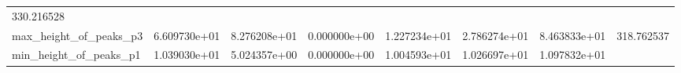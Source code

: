\documentclass[11pt]{article}
\begin{document}
\begin{longtable}[]{@{}llllllll@{}}
\begin{minipage}[t]{0.08\columnwidth}
330.216528\strut
\end{minipage}\tabularnewline
\begin{minipage}[t]{0.16\columnwidth}\raggedright
max\_height\_of\_peaks\_p3\strut
\end{minipage} & \begin{minipage}[t]{0.09\columnwidth}\raggedright
6.609730e+01\strut
\end{minipage} & \begin{minipage}[t]{0.09\columnwidth}\raggedright
8.276208e+01\strut
\end{minipage} & \begin{minipage}[t]{0.09\columnwidth}\raggedright
0.000000e+00\strut
\end{minipage} & \begin{minipage}[t]{0.09\columnwidth}\raggedright
1.227234e+01\strut
\end{minipage} & \begin{minipage}[t]{0.09\columnwidth}\raggedright
2.786274e+01\strut
\end{minipage} & \begin{minipage}[t]{0.09\columnwidth}\raggedright
8.463833e+01\strut
\end{minipage} & \begin{minipage}[t]{0.08\columnwidth}\raggedright
318.762537\strut
\end{minipage}\tabularnewline
\begin{minipage}[t]{0.16\columnwidth}\raggedright
min\_height\_of\_peaks\_p1\strut
\end{minipage} & \begin{minipage}[t]{0.09\columnwidth}\raggedright
1.039030e+01\strut
\end{minipage} & \begin{minipage}[t]{0.09\columnwidth}\raggedright
5.024357e+00\strut
\end{minipage} & \begin{minipage}[t]{0.09\columnwidth}\raggedright
0.000000e+00\strut
\end{minipage} & \begin{minipage}[t]{0.09\columnwidth}\raggedright
1.004593e+01\strut
\end{minipage} & \begin{minipage}[t]{0.09\columnwidth}\raggedright
1.026697e+01\strut
\end{minipage} & \begin{minipage}[t]{0.09\columnwidth}\raggedright
1.097832e+01\strut
\end{minipage} & \begin{minipage}[t]{0.08\columnwidth}\raggedright

\end{minipage}
\end{longtable}
\end{document}
